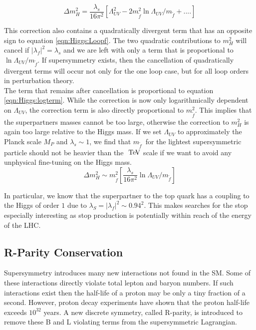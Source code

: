 \begin{equation}
\Delta m_H^2 = \frac{\lambda_s}{16\pi^2}[\Lambda^2_{UV} - 2m_{\tilde{f}}^2 \ln{\Lambda_{UV}/m_{\tilde{f}}}+ ....]
\label{eqn:Higgs:LoopS}
\end{equation}

\indent This correction also contains a quadratically divergent term that has an opposite sign to equation \ref{eqn:Higgs:Loopf}.  The two quadratic contributions to $m_H^2$ will cancel if $|\lambda_f|^2 = \lambda_s$ and we are left with only a term that is proportional to $\ln{\Lambda_{UV}/m_{\tilde{f}}}$.  If supersymmetry exists, then the cancellation of quadratically divergent terms will occur not only for the one loop case, but for all loop orders in perturbation theory. \\

\indent The term that remains after cancellation is proportional to equation \ref{eqn:Higgs:logterm}. While the correction is now only logarithmically dependent on $\Lambda_{UV}$, the correction term is also directly proportional to $m_{\tilde{f}}^2$.  This implies that the superpartners masses cannot be too large, otherwise the correction to $m_H^2$ is again too large relative to the Higgs mass.  If we set $\Lambda_{UV}$ to approximately the Planck scale $M_P$ and $\lambda_s \sim 1$, we find that $m_{\tilde{f}}$~for the lightest supersymmetric particle should not be heavier than the $\tev$ scale if we want to avoid any unphysical fine-tuning on the Higgs mass.\cite{MartinSUSY} \\

\begin{equation}
\Delta m_H^2 \sim m_{\tilde{f}}^2[\frac{\lambda_s}{16\pi^2}\ln{\Lambda_{UV}/m_{\tilde{f}}}]
\label{eqn:Higgs:logterm}
\end{equation}

\indent In particular, we know that the superpartner to the top quark has a coupling to the Higgs of order $1$ due to $\lambda_S = |\lambda_f|^2 \sim 0.94^2$. This makes searches for the stop especially interesting as stop production is potentially within reach of the energy of the LHC. \\

\subsection{R-Parity Conservation}

\indent Supersymmetry introduces many new interactions not found in the SM.  Some of these interactions directly violate total lepton and baryon numbers.  If such interactions exist then the half-life of a proton may be only a tiny fraction of a second.  However, proton decay experiments have shown that the proton half-life exceeds $10^{32}$ years.  A new discrete symmetry, called R-parity, is introduced to remove these B and L violating terms from the supersymmetric Lagrangian.  \\


